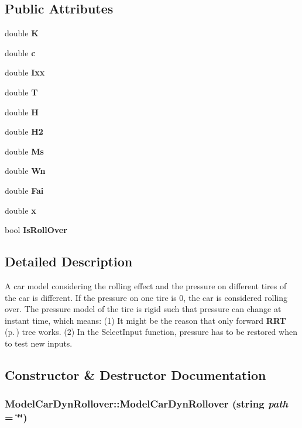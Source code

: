 \subsection*{Public Attributes}
\begin{CompactItemize}
\item 
double {\bf K}
\item 
double {\bf c}
\item 
double {\bf Ixx}
\item 
double {\bf T}
\item 
double {\bf H}
\item 
double {\bf H2}
\item 
double {\bf Ms}
\item 
double {\bf Wn}
\item 
double {\bf Fai}
\item 
double {\bf x}
\item 
bool {\bf Is\-Roll\-Over}
\end{CompactItemize}


\subsection{Detailed Description}
A car model considering the rolling effect and the pressure on different tires of the car is different. If the pressure on one tire is 0, the car is considered rolling over. The pressure model of the tire is rigid such that pressure can change at instant time, which means: (1) It might be the reason that only forward {\bf RRT} {\rm (p.\,\pageref{classRRT})} tree works. (2) In the Select\-Input function, pressure has to be restored when to test new inputs.



\subsection{Constructor \& Destructor Documentation}
\subsubsection{\setlength{\rightskip}{0pt plus 5cm}Model\-Car\-Dyn\-Rollover::Model\-Car\-Dyn\-Rollover (string {\em path} = \char`\"{}\char`\"{})}\label{classModelCarDynRollover_a0}


